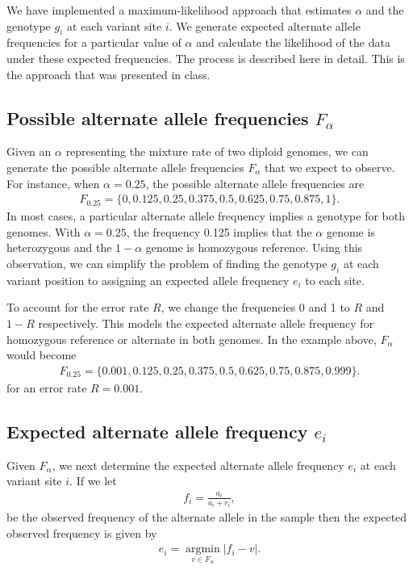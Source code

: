 \documentclass[12pt]{article}
\begin{document}
We have implemented a maximum-likelihood approach that estimates $\alpha$ and the genotype $g_i$ at each variant site $i$. We generate expected alternate allele frequencies for a particular value of $\alpha$ and calculate the likelihood of the data under these expected frequencies. The process is described here in detail.  This is the approach that was presented in class.

\subsection{Possible alternate allele frequencies $F_\alpha$}
Given an $\alpha$ representing the mixture rate of two diploid genomes, we can generate the possible alternate allele frequencies $F_\alpha$ that we expect to observe. For instance, when $\alpha=0.25$, the possible alternate allele frequencies are 
\begin{align}
F_{0.25}=\{0, 0.125, 0.25, 0.375, 0.5, 0.625, 0.75, 0.875, 1\}. 
\end{align}
In most cases, a particular alternate allele frequency implies a genotype for both genomes. With $\alpha=0.25$, the frequency 0.125 implies that the $\alpha$ genome is heterozygous and the $1-\alpha$ genome is homozygous reference. Using this observation, we can simplify the problem of finding the genotype $g_i$ at each variant position to assigning an expected allele frequency $e_i$ to each site. 

To account for the error rate $R$, we change the frequencies 0 and 1 to $R$ and $1-R$ respectively. This models the expected alternate allele frequency for homozygous reference or alternate in both genomes. In the example above, $F_\alpha$ would become
\begin{align}
F_{0.25}=\{0.001, 0.125, 0.25, 0.375, 0.5, 0.625, 0.75, 0.875, 0.999\}. 
\end{align}
for an error rate $R=0.001$.

\subsection{Expected alternate allele frequency $e_i$}
\label{ei}
Given $F_\alpha$, we next determine the expected alternate allele frequency $e_i$ at each variant site $i$. If we let
\begin{align}
f_i = \frac{a_i}{a_i+r_i},
\end{align}
be the observed frequency of the alternate allele in the sample then the expected observed frequency is given by
\begin{align}
e_i = \underset{v \in F_\alpha}{\operatorname{argmin}} | f_i - v |.
\end{align}
\end{document}
